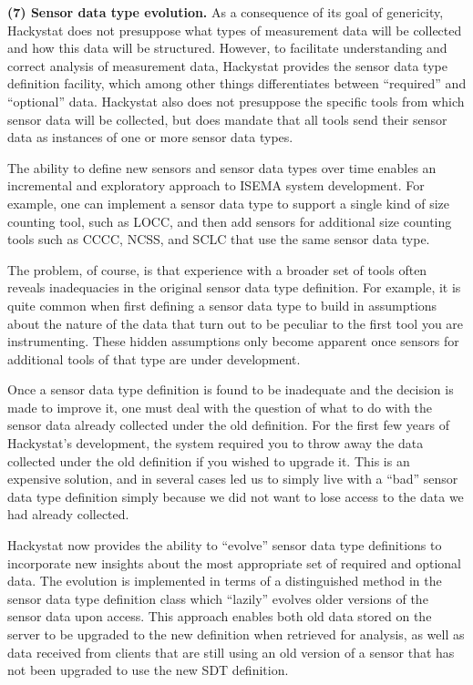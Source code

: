 \documentclass[10pt,twocolumn]{article}
\begin{document}
{\bf (7) Sensor data type evolution.} As a consequence of its goal of 
genericity, Hackystat does not presuppose what types of measurement data 
will be collected and how this data will be structured.  However, to 
facilitate understanding and correct analysis of measurement data, 
Hackystat provides the sensor data type definition facility, which 
among other things differentiates between ``required'' and ``optional''
data.  Hackystat also does not presuppose the specific tools from which
sensor data will be collected, but does mandate that all tools send
their sensor data as instances of one or more sensor data types. 

The ability to define new sensors and sensor data types over time enables
an incremental and exploratory approach to ISEMA system development. For
example, one can implement a sensor data type to support a single kind of 
size counting tool, such as LOCC, and then add sensors for additional 
size counting tools such as CCCC, NCSS, and SCLC that use the same 
sensor data type.  

The problem, of course, is that experience with a broader set of tools
often reveals inadequacies in the original sensor data type definition.
For example, it is quite common when first defining a sensor data type to
build in assumptions about the nature of the data that turn out to be
peculiar to the first tool you are instrumenting. These hidden assumptions
only become apparent once sensors for additional tools of that type are
under development.   

Once a sensor data type definition is found to be inadequate and the
decision is made to improve it, one must deal with the question of what to
do with the sensor data already collected under the old definition.  For
the first few years of Hackystat's development, the system required you to
throw away the data collected under the old definition if you wished to
upgrade it.  This is an expensive solution, and in several cases led us to
simply live with a ``bad'' sensor data type definition simply because we
did not want to lose access to the data we had already collected.

Hackystat now provides the ability to ``evolve'' sensor data type
definitions to incorporate new insights about the most appropriate set of
required and optional data.  The evolution is implemented in terms of a
distinguished method in the sensor data type definition class which ``lazily'' 
evolves older versions of the sensor data upon access. This approach 
enables both old data stored on the server to be upgraded to the new
definition when retrieved for analysis, as well as data received from
clients that are still using an old version of a sensor that has not been
upgraded to use the new SDT definition.  
\end{document}
